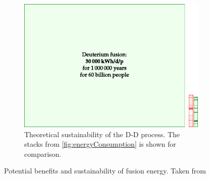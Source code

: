 \begin{figure}[htbp]
\begin{subfigure}[h]{1.00\textwidth}
        \label{fig:lithium}
    \end{subfigure}
    \vfill
    \begin{subfigure}[h]{1.00\textwidth}
        \centering
        \includegraphics{fig/intro/DDFusion}
        \caption{
        Theoretical sustainability of the D-D process.
        The stacks from \cref{fig:energyConsumption} is shown for comparison.
        }
        \label{fig:DDFusion}
    \end{subfigure}
    \caption{Potential benefits and sustainability of fusion energy.
    Taken from \cite{Mackay2009book}}
    \label{fig:potFusion}
\end{figure}
%

